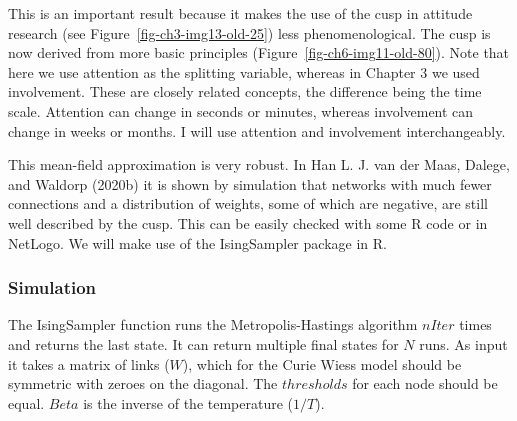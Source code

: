 \documentclass[
  a4paper,
  DIV=11,
  numbers=noendperiod,
  oneside]{scrreprt}
\begin{document}
This is an important result because it makes the use of the cusp in
attitude research (see Figure~\ref{fig-ch3-img13-old-25}) less
phenomenological. The cusp is now derived from more basic principles
(Figure~\ref{fig-ch6-img11-old-80}). Note that here we use attention as
the splitting variable, whereas in Chapter 3 we used involvement. These
are closely related concepts, the difference being the time scale.
Attention can change in seconds or minutes, whereas involvement can
change in weeks or months. I will use attention and involvement
interchangeably.

This mean-field approximation is very robust. In Han L. J. van der Maas,
Dalege, and Waldorp (2020b) it is shown by simulation that networks with
much fewer connections and a distribution of weights, some of which are
negative, are still well described by the cusp. This can be easily
checked with some R code or in NetLogo. We will make use of the
IsingSampler package in R.

\hypertarget{sec-Simulation}{%
\subsubsection{Simulation}\label{sec-Simulation}}

The IsingSampler function runs the Metropolis-Hastings algorithm
\(nIter\) times and returns the last state. It can return multiple final
states for \(N\) runs. As input it takes a matrix of links (\(W\)),
which for the Curie Wiess model should be symmetric with zeroes on the
diagonal. The \(thresholds\) for each node should be equal. \(Beta\) is
the inverse of the temperature (\(1/T\)).
\end{document}
